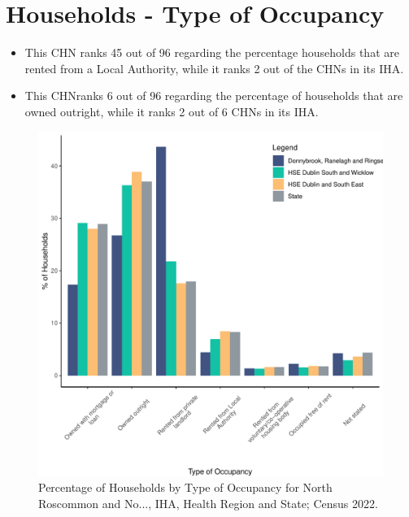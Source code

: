 \documentclass{article}
\begin{document}
\section{Households - Type of Occupancy}\label{sect:Households}
\begin{itemize}
\item This CHN ranks  45 out of 96 regarding the percentage households that are rented from a Local Authority, while it ranks  2 out of the CHNs in its IHA. 
\item This CHNranks  6 out of 96 regarding the percentage of households that are owned outright, while it ranks   2 out of 6 CHNs in its IHA.
\end{itemize}
\begin{figure}[H]
	\centering
	\includegraphics[width = 140mm]{../figures/HouseholdsED.pdf}
	\caption{Percentage of Households by Type of Occupancy for North Roscommon and No..., IHA, Health Region and State; Census 2022.}
	\label{fig:vbnv}
	\end{figure}
\end{document}

